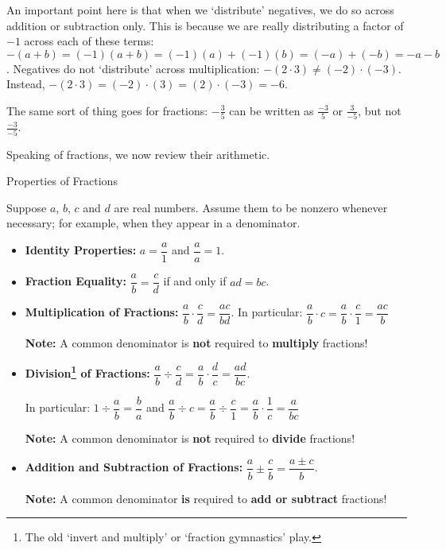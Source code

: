 An important point here is that when we `distribute' negatives, we do so across addition or subtraction only.  This is because we are really distributing a factor of $-1$ across each of these terms:  $-(a+b) = (-1)(a+b) = (-1)(a) + (-1)(b) = (-a)+(-b) = -a-b$. Negatives do not `distribute' across multiplication:  $- (2 \cdot 3) \neq (-2)\cdot(-3)$. Instead, $-(2\cdot 3) = (-2)\cdot (3) = (2) \cdot (-3) = -6$.  

The same sort of thing goes for fractions:  $- \frac{3}{5}$ can be written as $\frac{-3}{5}$ or $\frac{3}{-5}$, but not $\frac{-3}{-5}$.  

Speaking of fractions, we now review their arithmetic.

\begin{floatbox}[label=box:fractionarithmetic]{Properties of Fractions}

Suppose $a$, $b$, $c$ and $d$ are real numbers.  Assume them to be nonzero whenever necessary; for example,  when they appear in a denominator.

\begin{itemize}

\item  \textbf{Identity Properties:}  $a = \dfrac{a}{1}$ and $\dfrac{a}{a} = 1$.

\item  \textbf{Fraction Equality:}  $\dfrac{a}{b} = \dfrac{c}{d}$ if and only if $ad = bc$. 

\item  \textbf{Multiplication of Fractions:}  $\dfrac{a}{b} \cdot \dfrac{c}{d} = \dfrac{ac}{bd}$. In particular:  $\dfrac{a}{b} \cdot c = \dfrac{a}{b} \cdot \dfrac{c}{1} = \dfrac{ac}{b}$

\textbf{Note:}  A common denominator is \textbf{not} required to \textbf{multiply} fractions!

\item  \textbf{Division\footnote{The old `invert and multiply' or `fraction gymnastics' play.} of Fractions:}  $\dfrac{a}{b} \div \dfrac{c}{d} = \dfrac{a}{b} \cdot \dfrac{d}{c} = \dfrac{ad}{bc}$. 

In particular: $1 \div \dfrac{a}{b} = \dfrac{b}{a}$ and  $\dfrac{a}{b} \div c = \dfrac{a}{b} \div \dfrac{c}{1}  = \dfrac{a}{b} \cdot \dfrac{1}{c} = \dfrac{a}{bc}$

\textbf{Note:}  A common denominator is \textbf{not} required to \textbf{divide} fractions!

\item  \textbf{Addition and Subtraction of Fractions:}  $\dfrac{a}{b} \pm \dfrac{c}{b} = \dfrac{a \pm c}{b}$.  

\textbf{Note:}  A common denominator \textbf{is} required to \textbf{add or subtract} fractions!

\end{itemize}

\end{floatbox}

